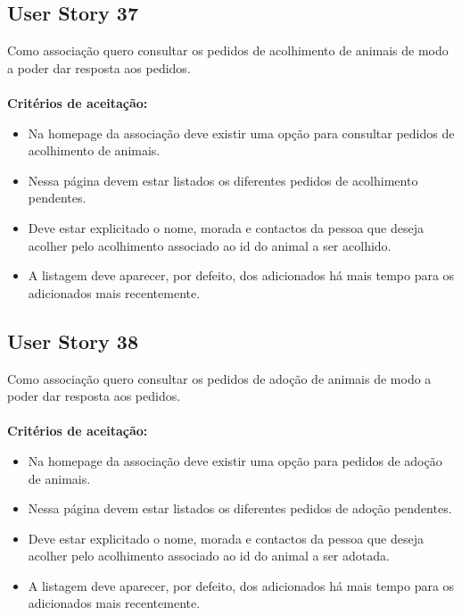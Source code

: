 \documentclass[a4paper,11pt]{article}
\begin{document}
\subsection*{User Story 37}
Como associação quero consultar os pedidos de acolhimento de animais de modo a poder dar resposta aos pedidos.\\\\
\textbf{Critérios de aceitação:}
\begin{itemize}
    \item Na homepage da associação deve existir uma opção para consultar pedidos de acolhimento de animais.
    \item Nessa página devem estar listados os diferentes pedidos de acolhimento pendentes.
    \item Deve estar explicitado o nome, morada e contactos da pessoa que deseja acolher pelo acolhimento associado ao id do animal a ser acolhido.
    \item A listagem deve aparecer, por defeito, dos adicionados há mais tempo para os adicionados mais recentemente.
\end{itemize}

\subsection*{User Story 38}
Como associação quero consultar os pedidos de adoção de animais de modo a poder dar resposta aos pedidos.\\\\
\textbf{Critérios de aceitação:}
\begin{itemize}
    \item Na homepage da associação deve existir uma opção para pedidos de adoção de animais.
    \item Nessa página devem estar listados os diferentes pedidos de adoção pendentes.
    \item Deve estar explicitado o nome, morada e contactos da pessoa que deseja acolher pelo acolhimento associado ao id do animal a ser adotada.
    \item A listagem deve aparecer, por defeito, dos adicionados há mais tempo para os adicionados mais recentemente.
\end{itemize}
\end{document}
